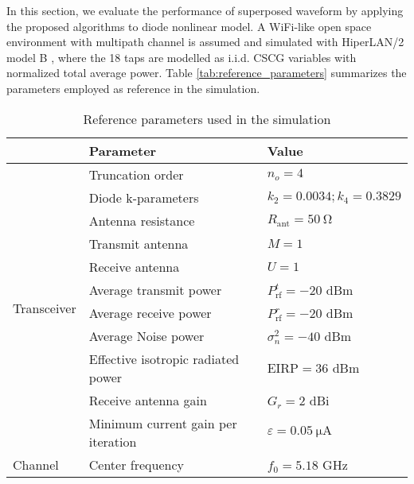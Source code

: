 In this section, we evaluate the performance of superposed waveform by applying the proposed algorithms to diode nonlinear model. A WiFi-like open space environment with multipath channel is assumed and simulated with HiperLAN/2 model B \cite{Medbo1998}, where the 18 taps are modelled as i.i.d. CSCG variables with normalized total average power. Table \ref{tab:reference_parameters} summarizes the parameters employed as reference in the simulation.

\begin{table}[h!]
\caption{Reference parameters used in the simulation}
\begin{tabular}{lll}
                              & Parameter                          & Value                                \\ \hline
\multirow{11}{*}{Transceiver} & Truncation order                   & ${n_o} = 4$                          \\
                              & Diode k-parameters                 & ${k_2} = 0.0034;{k_4} = 0.3829$      \\
                              & Antenna resistance                 & ${R_{{\text{ant}}}} = \SI{50}{\ohm}$ \\
                              & Transmit antenna                   & $M = 1$                              \\
                              & Receive antenna                    & $U = 1$                              \\
                              & Average transmit power             & $P_{{\text{rf}}}^t =  - 20$ dBm      \\
                              & Average receive power              & $P_{{\text{rf}}}^r =  - 20$ dBm      \\
                              & Average Noise power                & $\sigma _n^2 =  - 40$ dBm            \\
                              & Effective isotropic radiated power & $\text{EIRP} = 36$ dBm               \\
                              & Receive antenna gain               & ${G_r} = 2$ dBi                      \\
                              & Minimum current gain per iteration & $\varepsilon  = \SI{0.05}{\uA}$      \\ \hline
\multirow{7}{*}{Channel}        & Center frequency                   & ${f_0} = 5.18$ GHz                   \\

\end{tabular}
\end{table}
